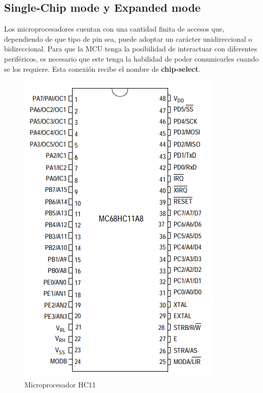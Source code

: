 \subsection{Single-Chip mode y Expanded mode}
Los microprocesadores cuentan con una cantidad finita de accesos que, dependiendo de que tipo de pin sea, puede adoptar un carácter unidireccional o bidireccional. Para que la MCU tenga la posibilidad de interactuar con diferentes periféricos, es necesario que este tenga la habilidad de poder comunicarles cuando se los requiere. Esta conexión recibe el nombre de \textbf{chip-select}.

\begin{figure}[H]
	\centering
	\includegraphics[scale=0.5]{ImagenesEjercicio3/MicroHC11}
	\caption{Microprocesador HC11}
	\label{fig:microhc11}
\end{figure}

